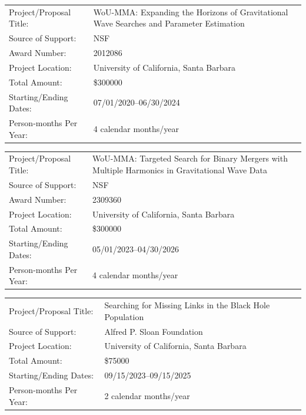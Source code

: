 \documentclass{article}
\newlength{\cvindent}
\newlength{\cvtablewidth}
\newcommand{\cvtableindent}{\noindent\hspace*{\cvindent}}
\newcommand{\cvtablesectionstart}{\vspace{0pt}}
\newcommand{\cvtablesep}{\vspace{4pt}}
\begin{document}
\cvtablesectionstart

\cvtableindent\begin{tabular}{|p{0.3\cvtablewidth} p{0.62\cvtablewidth}|}
\hline
Project/Proposal Title:	& WoU-MMA: Expanding the Horizons of Gravitational Wave Searches and Parameter Estimation\\
Source of Support: 	& NSF\\
Award Number:       & 2012086\\
Project Location: 	& University of California, Santa Barbara\\
Total Amount: & \$300000\\
Starting/Ending Dates: 	& 07/01/2020--06/30/2024\\
Person-months Per Year: & 4 calendar months/year\\
\hline
\end{tabular} 

\cvtablesep

\cvtableindent\begin{tabular}{|p{0.3\cvtablewidth} p{0.62\cvtablewidth}|}
\hline
Project/Proposal Title:	& WoU-MMA: Targeted Search for Binary Mergers with Multiple Harmonics in Gravitational Wave Data\\
Source of Support: 	& NSF\\
Award Number:       & 2309360\\
Project Location: 	& University of California, Santa Barbara\\
Total Amount: & \$300000\\
Starting/Ending Dates: 	& 05/01/2023--04/30/2026\\
Person-months Per Year: & 4 calendar months/year\\
\hline
\end{tabular} 

\cvtablesep

\cvtableindent\begin{tabular}{|p{0.3\cvtablewidth} p{0.62\cvtablewidth}|}
\hline
Project/Proposal Title:	& Searching for Missing Links in the Black Hole Population\\
Source of Support: 	& Alfred P. Sloan Foundation\\
Project Location: 	& University of California, Santa Barbara\\
Total Amount: & \$75000\\
Starting/Ending Dates: 	& 09/15/2023--09/15/2025\\
Person-months Per Year: & 2 calendar months/year\\
\hline
\end{tabular}
\end{document}
